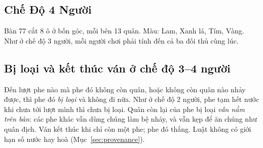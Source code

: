 \subsection{Chế Độ 4 Người}
Bàn 7{\texttimes}7 cắt 8 ô ở bốn góc, mỗi bên 13 quân.
Màu: Lam, Xanh lá, Tím, Vàng. Như ở chế độ 3 người, mỗi người chơi phải
tính đến cả ba đối thủ cùng lúc.

\subsection{Bị loại và kết thúc ván ở chế độ 3--4 người}
\label{ssec:elimination}

Đến lượt phe nào mà phe đó không còn quân, hoặc không còn quân nào nhảy
được, thì phe đó \emph{bị loại} và không đi nữa. Như ở chế độ 2 người, phe
tạm hết nước khi chưa tới lượt mình thì chưa bị loại. Quân còn lại của phe
bị loại \emph{vẫn nằm trên bàn}: các phe khác vẫn dùng chúng làm bệ nhảy, và
vẫn kẹp để ăn chúng như quân địch. Ván kết thúc khi chỉ còn một phe; phe đó
thắng. Luật không có giới hạn số nước hay hoà
(Mục~\ref{sec:provenance}).
